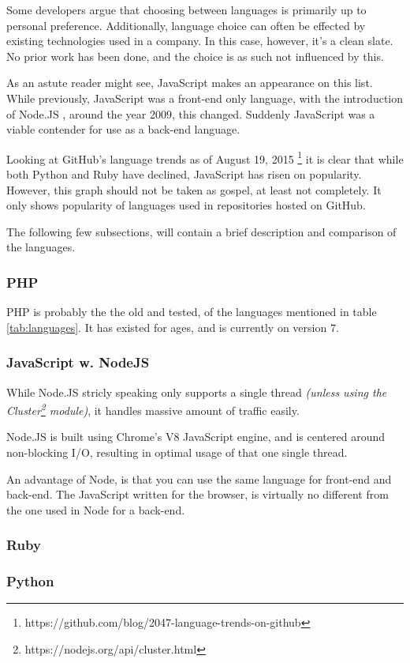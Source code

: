 			Some developers argue that choosing between languages is primarily up to personal preference. Additionally, language choice can often be effected by existing technologies used in a company. In this case, however, it's a clean slate. No prior work has been done, and the choice is as such not influenced by this.

			As an astute reader might see, JavaScript makes an appearance on this list. While previously, JavaScript was a front-end only language, with the introduction of Node.JS , around the year 2009, this changed. Suddenly JavaScript was a viable contender for use as a back-end language.

			Looking at GitHub's language trends as of August 19, 2015 \footnote{https://github.com/blog/2047-language-trends-on-github} it is clear that while both Python and Ruby have declined, JavaScript has risen on popularity. However, this graph should not be taken as gospel, at least not completely. It only shows popularity of languages used in repositories hosted on GitHub.

			The following few subsections, will contain a brief description and comparison of the languages.

			\subsubsection*{PHP}
				PHP is probably the the old and tested, of the languages mentioned in table \ref{tab:languages}. It has existed for ages, and is currently on version 7.



			\subsubsection*{JavaScript w. NodeJS}
				While Node.JS stricly speaking only supports a single thread \emph{(unless using the Cluster\footnote{https://nodejs.org/api/cluster.html} module)}, it handles massive amount of traffic easily.

				Node.JS is built using Chrome's V8 JavaScript engine, and is centered around non-blocking I/O, resulting in optimal usage of that one single thread.

				An advantage of Node, is that you can use the same language for front-end and back-end. The JavaScript written for the browser, is virtually no different from the one used in Node for a back-end.
			\subsubsection*{Ruby}
			\subsubsection*{Python}